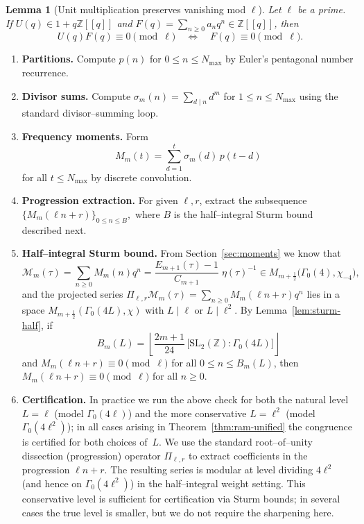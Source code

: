 \documentclass[11pt]{article}
\newtheorem{lemma}[theorem]{Lemma}
\theoremstyle{definition}
\theoremstyle{remark}
\begin{document}
\begin{lemma}[Unit multiplication preserves vanishing mod $\ell$]\label{lem:unit}
Let $\ell$ be a prime. If $U(q)\in 1+q\mathbb{Z}[[q]]$ and
$F(q)=\sum_{n\ge0}a_n q^n\in\mathbb{Z}[[q]]$, then
\[
U(q)F(q)\equiv 0\pmod{\ell}\quad\Longleftrightarrow\quad F(q)\equiv 0\pmod{\ell}.
\]
\end{lemma}

\begin{enumerate}
  \item \textbf{Partitions.} Compute $p(n)$ for $0\le n\le N_{\max}$ by Euler's
  pentagonal number recurrence.

  \item \textbf{Divisor sums.} Compute
  \(
    \sigma_m(n)=\sum_{d\mid n} d^m
  \)
  for $1\le n\le N_{\max}$ using the standard divisor--summing loop.

  \item \textbf{Frequency moments.} Form
  \[
    M_m(t)=\sum_{d=1}^{t}\sigma_m(d)\,p(t-d)
  \]
  for all $t\le N_{\max}$ by discrete convolution.

  \item \textbf{Progression extraction.} For given $\ell,r$, extract the
  subsequence
  \(
    \{M_m(\ell n+r)\}_{0\le n\le B},
  \)
  where $B$ is the half--integral Sturm bound described next. 

  \item \textbf{Half--integral Sturm bound.} From Section~\ref{sec:moments} we know
  that
  \[
    \mathcal{M}_m(\tau)
    =\sum_{n\ge0} M_m(n)q^n
    =\frac{E_{m+1}(\tau)-1}{C_{m+1}}\;\eta(\tau)^{-1}
    \in M_{m+\tfrac12}\bigl(\Gamma_0(4),\chi_{-4}\bigr),
  \]
  and the projected series
  \(
    \Pi_{\ell,r}\mathcal{M}_m(\tau)
    =\sum_{n\ge0} M_m(\ell n+r)q^n
  \)
  lies in a space $M_{m+\tfrac12}(\Gamma_0(4L),\chi)$ with $L\mid\ell$ or
  $L\mid\ell^2$.
  By Lemma~\ref{lem:sturm-half}, if
  \[
    B_m(L)
    =\left\lfloor \frac{2m+1}{24}\,
      \bigl[\mathrm{SL}_2(\mathbb{Z}):\Gamma_0(4L)\bigr]\right\rfloor
  \]
  and $M_m(\ell n+r)\equiv0\pmod{\ell}$ for all $0\le n\le B_m(L)$, then
  $M_m(\ell n+r)\equiv0\pmod{\ell}$ for all $n\ge0$.

  \item \textbf{Certification.} In practice we run the above check for both
  the natural level $L=\ell$ (model $\Gamma_0(4\ell)$) and the more
  conservative $L=\ell^2$ (model $\Gamma_0(4\ell^2)$); in all cases arising
  in Theorem~\ref{thm:ram-unified} the congruence is certified for both
  choices of~$L$.
  We use the standard root--of--unity dissection (progression) operator
  $\Pi_{\ell,r}$ to extract coefficients in the progression $\ell n+r$.
  The resulting series is modular at level dividing $4\ell^2$ (and hence on
  $\Gamma_0(4\ell^2)$) in the half--integral weight setting.  This conservative
  level is sufficient for certification via Sturm bounds; in several cases the
  true level is smaller, but we do not require the sharpening here.

\end{enumerate}
\end{document}
